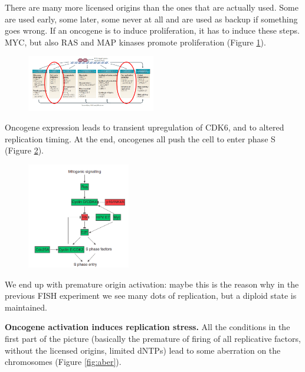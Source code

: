 There are many more licensed origins than the ones that are actually
used. Some are used early, some later, some never at all and are used as
backup if something goes wrong.
If an oncogene is to induce proliferation, it has to induce these steps.
MYC, but also RAS and MAP kinases promote proliferation (Figure \ref{fig:origins}).

\begin{figure}[H]
\centering
\includegraphics[width=0.5\textwidth]{../_resources/a78ad57bf8373a5417b0ddce30b8ed72.png}
\caption{}
\label{fig:origins}
\end{figure}

Oncogene expression leads to transient upregulation of CDK6, and to altered replication timing. At the end, oncogenes all push the cell to enter phase S (Figure \ref{fig:sphase}).

\begin{figure}[H]
\centering
\includegraphics[width=0.4\textwidth]{../_resources/32b183547f544448275d6f43d7693d7e.png} 
\caption{}
\label{fig:sphase}
\end{figure}

We end up with premature origin activation: maybe this is the reason why in
the previous FISH experiment we see many dots of replication, but a
diploid state is maintained.

\textbf{Oncogene activation induces replication stress.} All the conditions in the first part of the picture (basically the premature of firing of all replicative factors, without the licensed origins, limited dNTPs) lead to some aberration on the chromosomes (Figure \ref{fig:aber}).

